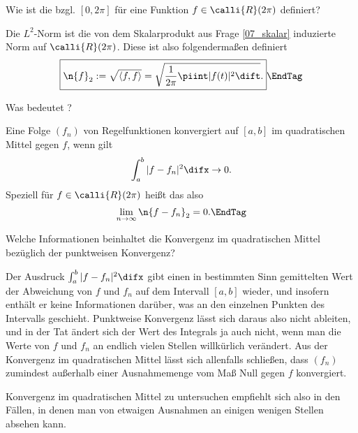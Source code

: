   \begin{frage}
    Wie ist die  bzgl. $[0,2\pi]$ für eine Funktion 
    $f\in\calli{R}(2\pi)$ definiert? 
  \end{frage}

  \begin{antwort}
    Die $L^2$-Norm ist die von dem Skalarprodukt aus Frage 
    \ref{07_skalar} induzierte Norm auf 
    $\calli{R}(2\pi)$. Diese ist also folgendermaßen definiert
    \begin{equation}
      \boxed{\n{ f }_2 := \sqrt{\langle f,f \rangle} = 
        \sqrt{ \frac{1}{2\pi} \piint |f(t)|^2 \dift}.} 
      \EndTag
    \end{equation}  
  \end{antwort}

  \begin{frage}
    Was bedeutet ?
  \end{frage}

  \begin{antwort}
    Eine Folge $(f_n)$ von Regelfunktionen konvergiert auf $[a,b]$ 
    im quadratischen Mittel gegen $f$, wenn gilt
    \[
    \int_a^b |f-f_n|^2 \difx \to 0.
    \]
    Speziell für $f\in\calli{R}(2\pi)$ heißt das also 
    \[
    \lim_{n\to\infty} \n {f-f_n}_2=0.
    \EndTag
    \]
  \end{antwort}

  \begin{frage}
    Welche Informationen beinhaltet die Konvergenz im quadratischen 
    Mittel bezüglich der punktweisen Konvergenz?
  \end{frage}

  \begin{antwort}
    Der Ausdruck $\int_a^b |f-f_n|^2 \difx$ gibt einen 
    in bestimmten Sinn gemittelten Wert der Abweichung von $f$ und $f_n$ auf 
    dem Intervall $[a,b]$ wieder, und insofern enthält er keine 
    Informationen darüber, was an den einzelnen 
    Punkten des Intervalls geschieht. Punktweise Konvergenz lässt sich daraus 
    also nicht ableiten, und in der Tat ändert sich der Wert des 
    Integrals ja auch nicht, wenn man die Werte von 
    $f$ und $f_n$ an endlich vielen  Stellen willkürlich verändert. 
    Aus der Konvergenz im quadratischen Mittel lässt sich allenfalls 
    schließen, dass $(f_n)$ zumindest 
    außerhalb einer Ausnahmemenge vom Maß Null gegen 
    $f$ konvergiert. 

    Konvergenz im quadratischen Mittel zu untersuchen empfiehlt sich also 
    in den Fällen, in denen man von etwaigen Ausnahmen an 
    einigen wenigen Stellen absehen kann. \AntEnd
  \end{antwort}

